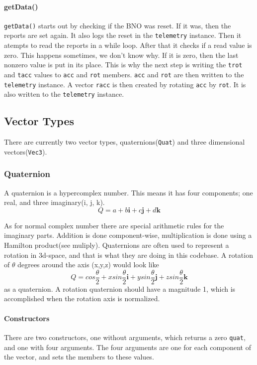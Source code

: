 \documentclass{article}
\begin{document}
\paragraph*{getData()}
\verb|getData()| starts out by checking if the BNO was reset. If it was, then the reports are set again. It also logs the reset in the \verb|telemetry| instance. Then it atempts to read the 
reports in a while loop. After that it checks if a read value is zero. This happens sometimes, we don't know why. If it is zero, then the last nonzero value is put in its place.
This is why the next step is writing the \verb|trot| and \verb|tacc| values to \verb|acc| and \verb|rot| members. \verb|acc| and \verb|rot| are then written to the \verb|telemetry| instance.
A vector \verb|racc| is then created by rotating \verb|acc| by \verb|rot|. It is also written to the \verb|telemetry| instance.

\subsection{Vector Types}
There are currently two vector types, quaternions(\verb|Quat|) and three dimensional vectors(\verb|Vec3|).


\subsubsection*{Quaternion}
A quaternion is a hypercomplex number. This means it has four components; one real, and three imaginary(i, j, k).
\begin{equation}
	Q = a + b\mathbf{i} + c\mathbf{j} + d\mathbf{k}
\end{equation}

As for normal complex number there are special arithmetic rules for the imaginary parts. Addition is done component-wise, multiplication is done using a
Hamilton product(see muliply). Quaternions are often used to represent a rotation in 3d-space, and that is what they are doing in this codebase. A rotation of $\theta$ degrees around
the axis (x,y,z) would look like
\begin{equation}
	Q=cos\frac{\theta}{2} + xsin\frac{\theta}{2}\mathbf{i} + ysin\frac{\theta}{2}\mathbf{j} + zsin\frac{\theta}{2}\mathbf{k}
\end{equation}
as a quaternion. A rotation quaternion should have a magnitude 1, which is accomplished when the rotation axis is normalized.

\paragraph*{Constructors}
There are two constructors, one without arguments, which returns a zero \verb|quat|, and one with four arguments. The four arguments are one for each component of the vector,
and sets the members to these values.
\end{document}
